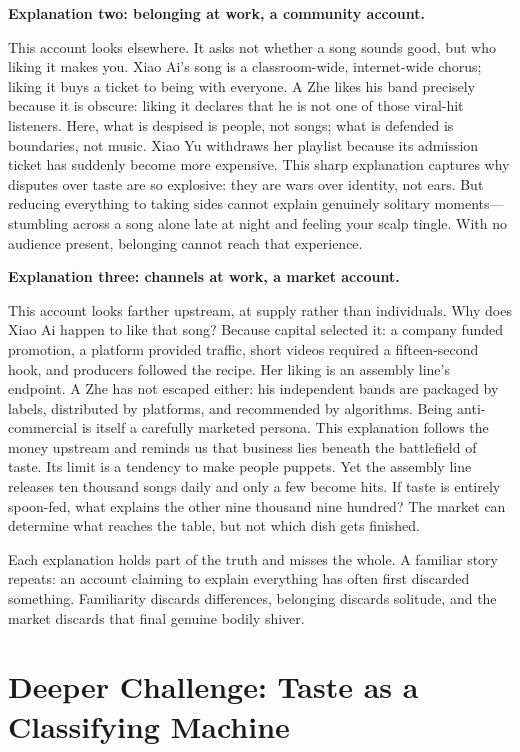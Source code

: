 \textbf{Explanation two: belonging at work, a community account.}

This account looks elsewhere. It asks not whether a song sounds good, but who liking it makes you. Xiao Ai's song is a classroom-wide, internet-wide chorus; liking it buys a ticket to being with everyone. A Zhe likes his band precisely because it is obscure: liking it declares that he is not one of those viral-hit listeners. Here, what is despised is people, not songs; what is defended is boundaries, not music. Xiao Yu withdraws her playlist because its admission ticket has suddenly become more expensive. This sharp explanation captures why disputes over taste are so explosive: they are wars over identity, not ears. But reducing everything to taking sides cannot explain genuinely solitary moments---stumbling across a song alone late at night and feeling your scalp tingle. With no audience present, belonging cannot reach that experience.

\textbf{Explanation three: channels at work, a market account.}

This account looks farther upstream, at supply rather than individuals. Why does Xiao Ai happen to like that song? Because capital selected it: a company funded promotion, a platform provided traffic, short videos required a fifteen-second hook, and producers followed the recipe. Her liking is an assembly line's endpoint. A Zhe has not escaped either: his independent bands are packaged by labels, distributed by platforms, and recommended by algorithms. Being anti-commercial is itself a carefully marketed persona. This explanation follows the money upstream and reminds us that business lies beneath the battlefield of taste. Its limit is a tendency to make people puppets. Yet the assembly line releases ten thousand songs daily and only a few become hits. If taste is entirely spoon-fed, what explains the other nine thousand nine hundred? The market can determine what reaches the table, but not which dish gets finished.

Each explanation holds part of the truth and misses the whole. A familiar story repeats: an account claiming to explain everything has often first discarded something. Familiarity discards differences, belonging discards solitude, and the market discards that final genuine bodily shiver.

\section[Taste as a Classifying Machine]{Deeper Challenge: Taste as a Classifying Machine}

